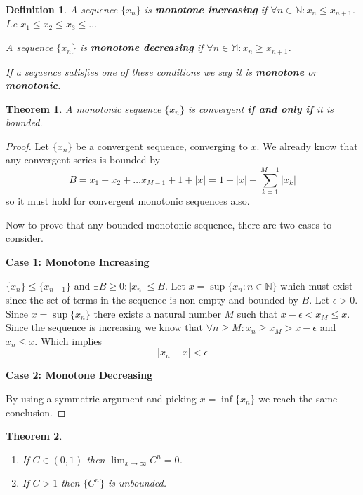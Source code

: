 \documentclass[12pt]{article}
\newtheorem{theorem}{Theorem}
\newtheorem{definition}{Definition}
\begin{document}
\begin{definition}
    A sequence \(\{x_n\}\) is \textbf{monotone increasing} if \(\forall n \in \mathbb N: 
    x_n \leq x_{n+1}\).
    I.e \(x_1 \leq x_2 \leq x_3 \leq \dots\) 

    \noindent
    A sequence \(\{x_n\}\) is \textbf{monotone decreasing} if \(\forall n \in 
    \mathbb M: x_n \geq x_{n+1}\).

    \noindent 
    If a sequence satisfies one of these conditions we say it is \textbf{monotone} 
    or \textbf{monotonic}.
    
\end{definition}
\begin{theorem}
    A monotonic sequence \(\{x_n\}\) is convergent \textbf{if and only if} it is bounded.
\end{theorem}
\begin{proof}
    Let \(\{x_n\}\) be a convergent sequence, converging to \(x\). 
    We already know that any convergent series is bounded by 
    \[ 
        B = x_1 + x_2 + \dots x_{M-1} + 1 + |x| = 1 + |x| + 
        \displaystyle\sum_{k=1}^{M-1}|x_k| 
    \]
    so it must hold for convergent monotonic sequences also. 

    \noindent 
    Now to prove that any bounded monotonic sequence, there are two cases to consider.

    \noindent 
    \textbf{Case 1: Monotone Increasing} 

    \noindent 
    \(\{x_n\} \leq \{x_{n+1}\}\) and \(\exists B \geq 0 : |x_n| \leq B\).
    Let \(x = \sup\{x_n : n \in \mathbb N\}\) which must exist since the set 
    of terms in the sequence is non-empty and bounded by \(B\).
    Let \(\epsilon > 0\). Since \(x = \sup\{x_n\}\) there exists a natural number 
    \(M\) such that \(x - \epsilon < x_M \leq x\).
    Since the sequence is increasing we know that 
    \(\forall n \geq M : x_n \geq x_M > x- \epsilon\) and \(x_n \leq x\). 
    Which implies 
    \[ 
        |x_n - x| < \epsilon
    \]

    \noindent 
    \textbf{Case 2: Monotone Decreasing}

    \noindent 
    By using a symmetric argument and picking \(x = \inf\{x_n\}\) we reach 
    the same conclusion.
    
    
\end{proof}
\begin{theorem}

    \noindent
    \begin{enumerate}
        \item  If \(C \in (0,1)\) then \(\displaystyle\lim_{x\to\infty} C^n = 0\). 
        \item If \(C > 1\) then \(\{C^n\}\) is unbounded. 
    \end{enumerate}
    
    
\end{theorem}
\end{document}
